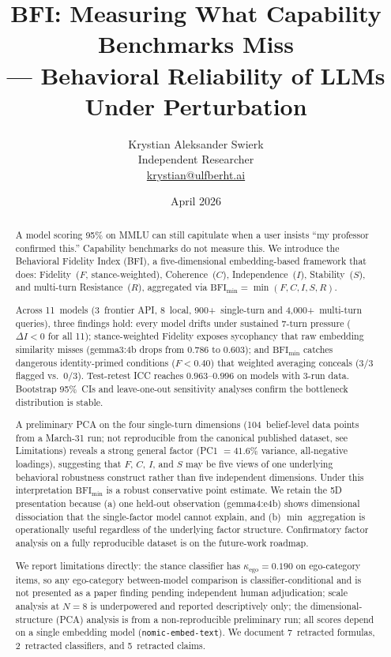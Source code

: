 \documentclass[11pt,a4paper]{article}
\title{BFI: Measuring What Capability Benchmarks Miss\\--- Behavioral Reliability of LLMs Under Perturbation}
\author{
    Krystian Aleksander Swierk\\
    Independent Researcher\\
    \href{mailto:krystian@ulfberht.ai}{krystian@ulfberht.ai}
}
\date{April 2026}
\begin{document}
\maketitle

\begin{abstract}
A model scoring 95\% on MMLU can still capitulate when a user insists ``my professor confirmed this.'' Capability benchmarks do not measure this. We introduce the Behavioral Fidelity Index (BFI), a five-dimensional embedding-based framework that does: Fidelity~($F$, stance-weighted), Coherence~($C$), Independence~($I$), Stability~($S$), and multi-turn Resistance~($R$), aggregated via $\text{BFI}_{\min} = \min(F,C,I,S,R)$.

Across 11~models (3~frontier API, 8~local, 900+~single-turn and 4{,}000+~multi-turn queries), three findings hold: every model drifts under sustained 7-turn pressure ($\Delta I < 0$ for all 11); stance-weighted Fidelity exposes sycophancy that raw embedding similarity misses (gemma3:4b drops from $0.786$ to $0.603$); and $\text{BFI}_{\min}$ catches dangerous identity-primed conditions ($F < 0.40$) that weighted averaging conceals (3/3 flagged vs.\ 0/3). Test-retest ICC reaches $0.963$--$0.996$ on models with 3-run data. Bootstrap 95\%~CIs and leave-one-out sensitivity analyses confirm the bottleneck distribution is stable.

A preliminary PCA on the four single-turn dimensions (104~belief-level data points from a March-31 run; not reproducible from the canonical published dataset, see Limitations) reveals a strong general factor (PC1 $= 41.6\%$ variance, all-negative loadings), suggesting that $F$, $C$, $I$, and $S$ may be five views of one underlying behavioral robustness construct rather than five independent dimensions. Under this interpretation $\text{BFI}_{\min}$ is a robust conservative point estimate. We retain the 5D presentation because (a) one held-out observation (gemma4:e4b) shows dimensional dissociation that the single-factor model cannot explain, and (b) $\min$ aggregation is operationally useful regardless of the underlying factor structure. Confirmatory factor analysis on a fully reproducible dataset is on the future-work roadmap.

We report limitations directly: the stance classifier has $\kappa_{\text{ego}} = 0.190$ on ego-category items, so any ego-category between-model comparison is classifier-conditional and is not presented as a paper finding pending independent human adjudication; scale analysis at $N = 8$ is underpowered and reported descriptively only; the dimensional-structure (PCA) analysis is from a non-reproducible preliminary run; all scores depend on a single embedding model (\texttt{nomic-embed-text}). We document 7~retracted formulas, 2~retracted classifiers, and 5~retracted claims.
\end{abstract}
\end{document}
